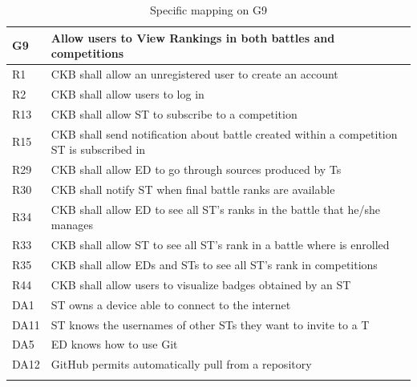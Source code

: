   \begin{longtable}{|l|p{12cm}|}
    \hline
    \textbf{G9} & \textbf{Allow users to View Rankings in both battles and competitions}      \\
    \hline
    R1 & CKB shall allow an unregistered user to create an account \\
    \hline
    R2 & CKB shall allow users to log in \\
    \hline
    R13 & CKB shall allow ST to subscribe to a competition \\
    \hline
    R15 & CKB shall send notification about battle created within a competition ST is subscribed in \\
    \hline
    R29 & CKB shall allow ED to go through sources produced by Ts \\
    \hline
    R30 & CKB shall notify ST when final battle ranks are available \\
    \hline
    R34 & CKB shall allow ED to see all ST’s ranks in the battle that he/she manages \\
    \hline
    R33 & CKB shall allow ST to see all ST’s rank in a battle where is enrolled \\
    \hline
    R35 & CKB shall allow EDs and STs to see all ST’s rank in competitions \\
    \hline
    R44 & CKB shall allow users to visualize badges obtained by an ST \\
    \hline
    DA1 & ST owns a device able to connect to the internet \\
    \hline
    DA11 & ST knows the usernames of other STs they want to invite to a T \\
    \hline
    DA5 & ED knows how to use Git \\
    \hline
    DA12 & GitHub permits automatically pull from a repository \\
    \hline

    \caption{Specific mapping on G9}
    \label{tab:mappingG9}
  \end{longtable}

